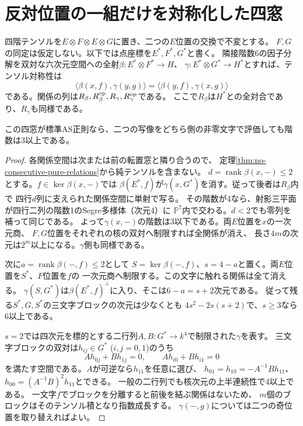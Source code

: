 \section{反対位置の一組だけを対称化した四窓}
\label{sec:one-opposite-symmetric-evaluations}
四階テンソルを$E\otimes F\otimes E\otimes G$に置き、二つの$E$位置の交換で不変とする。
$F,G$の同定は仮定しない。以下では点座標を$E^*,F^*,G^*$と書く。
隣接階数6の因子分解を双対な六次元空間への全射$\beta:E^*\otimes F^*\to H$、
$\gamma:E^*\otimes G^*\to H^*$とすれば、テンソル対称性は
\[
 \langle\beta(x,f),\gamma(y,g)\rangle
 =\langle\beta(y,f),\gamma(x,g)\rangle
\]
である。関係の列は$R_\beta,R_\beta^{\rm op},R_\gamma,R_\gamma^{\rm op}$である。
ここで$R_\beta$は$H^*$との全対合であり、$R_\gamma$も同様である。

\begin{theorem}[四つの評価の下界]\label{thm:single-opposite-evaluation-ranks}
この四窓が標準AS正則なら、二つの写像をどちら側の非零文字で評価しても階数は3以上である。
\end{theorem}
\begin{proof}
各関係空間は次または前の転置窓と隣り合うので、
定理\ref{thm:no-consecutive-pure-relations}から純テンソルを含まない。
$d=\operatorname{rank}\beta(x,-)\le2$とする。$f\in\ker\beta(x,-)$では
$\beta(E^*,f)$が$\gamma(x,G^*)$を消す。従って後者は$R_\beta$内で
四行$d$列に支えられた関係空間に単射で写る。
その階数が4なら、射影三平面が四行二列の階数1のSegre多様体（次元4）に
$\mathbb P^7$内で交わる。$d<2$でも零列を補って同じである。
よって$\gamma(x,-)$の階数は3以下である。両$E$位置を$x$の一次元商、
$F,G$位置をそれぞれの核の双対へ制限すれば全関係が消え、
長さ$4m$の次元は$2^m$以上になる。$\gamma$側も同様である。

次に$a=\operatorname{rank}\beta(-,f)\le2$として
$S=\ker\beta(-,f)$、$s=4-a$と置く。両$E$位置を$S^*$、$F$位置を$f$の
一次元商へ制限する。この文字に触れる関係は全て消える。
$\gamma(S,G^*)$は$\beta(E^*,f)^\perp$に入り、そこは$6-a=s+2$次元である。
従って残る$S^*,G,S^*$の三文字ブロックの次元は少なくとも
$4s^2-2s(s+2)$で、$s\ge3$なら6以上である。

$s=2$では四次元を標的とする二行列$A,B:G^*\to k^4$で制限された$\gamma$を表す。
三文字ブロックの双対は$h_{ij}\in G^*$ ($i,j=0,1$)のうち
\[
 Ah_{0j}+Bh_{1j}=0,\qquad Ah_{i0}+Bh_{i1}=0
\]
を満たす空間である。$A$が可逆なら$h_{11}$を任意に選び、
$h_{01}=h_{10}=-A^{-1}B h_{11}$、$h_{00}=(A^{-1}B)^2 h_{11}$とできる。
一般の二行列でも核次元の上半連続性で4以上である。
一文字$f$でブロックを分離すると前後を結ぶ関係はないため、
$m$個のブロックはそのテンソル積となり指数成長する。
$\gamma(-,g)$については二つの奇位置を取り替えればよい。
\end{proof}

